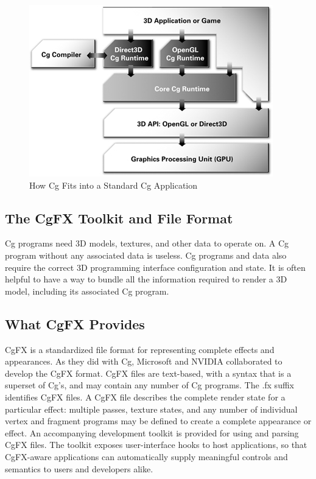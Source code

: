 \documentclass{book}
\begin{document}
\begin{figure}
    \centering
    \includegraphics[width=1\linewidth]{Images/fig1_13.jpg}
    \caption{How Cg Fits into a Standard Cg Application}
    \label{fig:1-13}
\end{figure}

\subsection{The CgFX Toolkit and File Format}

Cg programs need 3D models, textures, and other data to operate on. A Cg program without any associated data is useless. Cg programs and data also require the correct 3D programming interface configuration and state. It is often helpful to have a way to bundle all the information required to render a 3D model, including its associated Cg program.

\subsection*{What CgFX Provides}

CgFX is a standardized file format for representing complete effects and appearances. As they did with Cg, Microsoft and NVIDIA collaborated to develop the CgFX format. CgFX files are text-based, with a syntax that is a superset of Cg's, and may contain any number of Cg programs. The .fx suffix identifies CgFX files. A CgFX file describes the complete render state for a particular effect: multiple passes, texture states, and any number of individual vertex and fragment programs may be defined to create a complete appearance or effect. An accompanying development toolkit is provided for using and parsing CgFX files. The toolkit exposes user-interface hooks to host applications, so that CgFX-aware applications can automatically supply meaningful controls and semantics to users and developers alike.
\end{document}
